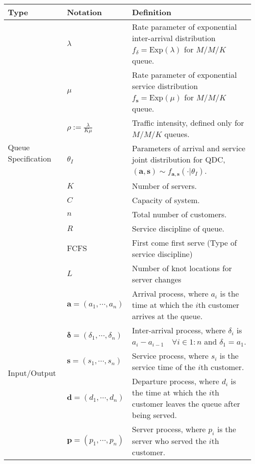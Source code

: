 \begin{tabular}{|l|l|p{10cm}|}
\hline
Type & Notation & Definition \\
\hline

\multirow{10}{3cm}{Queue Specification} 

& $\lambda$ & Rate parameter of exponential inter-arrival distribution $f_\delta = \text{Exp}(\lambda)$ for $M/M/K$ queue. \\
& $\mu$ & Rate parameter of exponential service distribution $f_{\mathbf{s}} = \text{Exp}(\mu)$ for $M/M/K$ queue.  \\
& $\rho := \frac{\lambda}{K \mu}$ & Traffic intensity, defined only for $M/M/K$ queues. \\ 
& $\theta_{I}$ & Parameters of arrival and service joint distribution for QDC, $(\mathbf{a}, \mathbf{s}) \sim f_{\mathbf{a}, \mathbf{s}}(\cdot | \theta_I )$. \\

& $K$ & Number of servers. \\
& $C$ & Capacity of system.  \\
& $n$ & Total number of customers. \\
& $R$ & Service discipline of queue. \\
& FCFS & First come first serve (Type of service discipline) \\
& $L$ & Number of knot locations for server changes \\

\hline

\multirow{8}{3cm}{Input/Output} 
& $\mathbf{a} = (a_1, \cdots, a_n )$ & Arrival process, where $a_i$ is the time at which the $i$th customer arrives at the queue. \\

& $\mathbf{\delta} = (\delta_1, \cdots, \delta_n )$ & Inter-arrival process, where $\delta_i$ is $a_i - a_{i-1} \quad \forall i \in 1:n$ and $\delta_1 = a_1$. \\

& $\mathbf{s} = (s_1, \cdots, s_n )$ & Service process, where $s_i$ is the service time of the $i$th customer. \\

& $\mathbf{d} = (d_1, \cdots, d_n )$ & Departure process, where $d_i$ is the time at which the $i$th customer leaves the queue after being served. \\

& $\mathbf{p} = (p_1, \cdots, p_n )$ & Server process, where $p_i$ is the server who served the $i$th customer. \\


\end{tabular}
